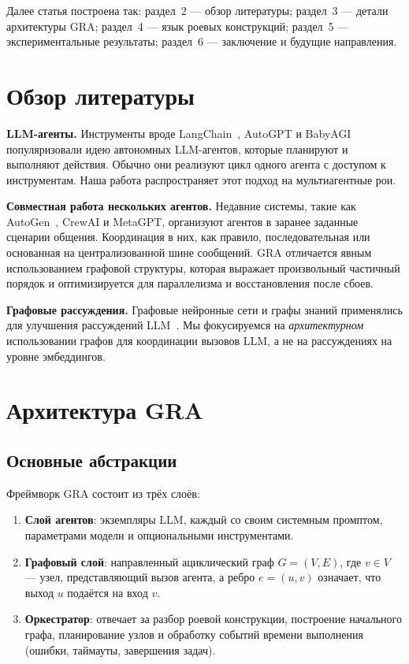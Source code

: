 \documentclass[11pt]{article}
\begin{document}
Далее статья построена так: раздел~2 --- обзор литературы; раздел~3 --- детали архитектуры GRA; раздел~4 --- язык роевых конструкций; раздел~5 --- экспериментальные результаты; раздел~6 --- заключение и будущие направления.

\section{Обзор литературы}
\textbf{LLM-агенты.} Инструменты вроде LangChain~\cite{langchain}, AutoGPT и BabyAGI популяризовали идею автономных LLM-агентов, которые планируют и выполняют действия.
Обычно они реализуют цикл одного агента с доступом к инструментам.
Наша работа распространяет этот подход на мультиагентные рои.

\textbf{Совместная работа нескольких агентов.} Недавние системы, такие как AutoGen~\cite{autogen}, CrewAI и MetaGPT, организуют агентов в заранее заданные сценарии общения.
Координация в них, как правило, последовательная или основанная на централизованной шине сообщений.
GRA отличается явным использованием графовой структуры, которая выражает произвольный частичный порядок и оптимизируется для параллелизма и восстановления после сбоев.

\textbf{Графовые рассуждения.} Графовые нейронные сети и графы знаний применялись для улучшения рассуждений LLM~\cite{yasunaga2021qa}.
Мы фокусируемся на \emph{архитектурном} использовании графов для координации вызовов LLM, а не на рассуждениях на уровне эмбеддингов.

\section{Архитектура GRA}
\subsection{Основные абстракции}
Фреймворк GRA состоит из трёх слоёв:
\begin{enumerate}
    \item \textbf{Слой агентов}: экземпляры LLM, каждый со своим системным промптом, параметрами модели и опциональными инструментами.
    \item \textbf{Графовый слой}: направленный ациклический граф $G=(V,E)$, где $v \in V$ --- узел, представляющий вызов агента, а ребро $e = (u,v)$ означает, что выход $u$ подаётся на вход $v$.
    \item \textbf{Оркестратор}: отвечает за разбор роевой конструкции, построение начального графа, планирование узлов и обработку событий времени выполнения (ошибки, таймауты, завершения задач).
\end{enumerate}
\end{document}
